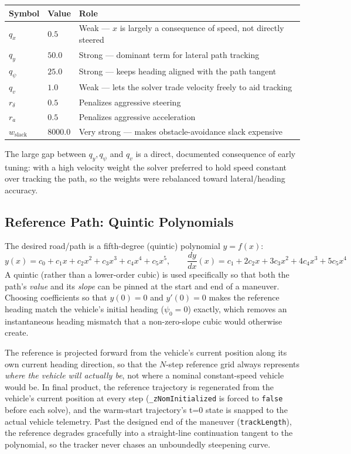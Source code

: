 ﻿\documentclass[11pt,a4paper]{article}
\begin{document}
\begin{center}
\begin{tabular}{@{}llp{7.5cm}@{}}
\toprule
Symbol & Value & Role \\
\midrule
$q_x$ & $0.5$ & Weak --- $x$ is largely a consequence of speed, not directly steered \\
$q_y$ & $50.0$ & Strong --- dominant term for lateral path tracking \\
$q_\psi$ & $25.0$ & Strong --- keeps heading aligned with the path tangent \\
$q_v$ & $1.0$ & Weak --- lets the solver trade velocity freely to aid tracking \\
$r_\delta$ & $0.5$ & Penalizes aggressive steering \\
$r_a$ & $0.5$ & Penalizes aggressive acceleration \\
$w_{\text{slack}}$ & $8000.0$ & Very strong --- makes obstacle-avoidance slack expensive \\
\bottomrule
\end{tabular}
\end{center}

The large gap between $q_y,q_\psi$ and $q_v$ is a direct, documented consequence of early tuning: with a high velocity weight the solver preferred to hold speed constant over tracking the path, so the weights were rebalanced toward lateral/heading accuracy.
\subsection{Reference Path: Quintic Polynomials}
The desired road/path is a fifth-degree (quintic) polynomial $y = f(x)$:
\begin{equation}
y(x) = c_0 + c_1 x + c_2 x^2 + c_3 x^3 + c_4 x^4 + c_5 x^5,\qquad
\frac{dy}{dx}(x) = c_1 + 2c_2 x + 3c_3 x^2 + 4c_4 x^3 + 5c_5 x^4
\end{equation}
A quintic (rather than a lower-order cubic) is used specifically so that both the path's \emph{value} and its \emph{slope} can be pinned at the start and end of a maneuver. Choosing coefficients so that $y(0)=0$ and $y'(0)=0$ makes the reference heading match the vehicle's initial heading ($\psi_0 = 0$) exactly, which removes an instantaneous heading mismatch that a non-zero-slope cubic would otherwise create.

The reference is projected forward from the vehicle's current position along its own current heading direction, so that the $N$-step reference grid always represents \emph{where the vehicle will actually be}, not where a nominal constant-speed vehicle would be. In final product, the reference trajectory is regenerated from the vehicle's current position at every step (\texttt{\_zNomInitialized} is forced to \texttt{false} before each solve), and the warm-start trajectory's t=0 state is snapped to the actual vehicle telemetry. Past the designed end of the maneuver (\texttt{trackLength}), the reference degrades gracefully into a straight-line continuation tangent to the polynomial, so the tracker never chases an unboundedly steepening curve.
\end{document}
